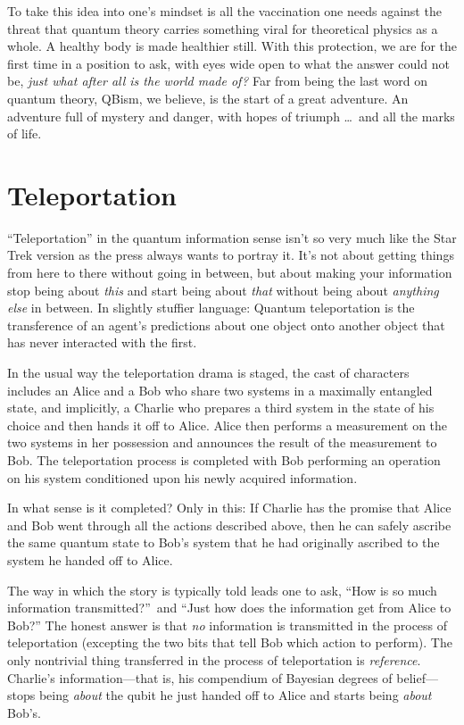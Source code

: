 \documentclass[aps,pra,superscriptaddress,12pt,tightenlines,nofootinbib]{revtex4-2}
\begin{document}
To take this idea into one's mindset is all the vaccination one needs against the threat that quantum theory carries something viral for theoretical physics as a whole.  A healthy body is made healthier still.  With this protection, we are for the first time in a position to ask, with eyes wide open to what the answer could not be, {\it just what after all is the world made of?}  Far from being the last word on quantum theory, QBism, we believe, is the start of a great adventure.  An adventure full of mystery and danger, with hopes of triumph \ldots\ and all the marks of life.


\section{Teleportation}

``Teleportation'' in the quantum information sense isn't so very much
like the Star Trek version as the press always wants to portray it.
It's not about getting things from here to there without going in
between, but about making your information stop being about {\it this\/} and
start being about {\it that\/} without being about {\it anything else\/} in between.
In slightly stuffier language: Quantum teleportation is the
transference of an agent's predictions about one object onto another
object that has never interacted with the first.

In the usual way the teleportation drama is staged, the cast of
characters includes an Alice and a Bob who share two systems in a
maximally entangled state, and implicitly, a Charlie who prepares a
third system in the state of his choice and then hands it off to
Alice.  Alice then performs a measurement on the two systems in her
possession and announces the result of the measurement to Bob.  The
teleportation process is completed with Bob performing an operation on
his system conditioned upon his newly acquired information.

In what sense is it completed?  Only in this:  If Charlie has the
promise that Alice and Bob went through all the actions described
above, then he can safely ascribe the same quantum state to Bob's
system that he had originally ascribed to the system he handed off to
Alice.

The way in which the story is typically told leads one to ask, ``How is so much information transmitted?''\  and ``Just how does the information get from Alice to Bob?'' The honest answer is that  {\it no\/} information is transmitted in the process of teleportation (excepting the two bits that tell Bob which action to perform).  The only nontrivial thing transferred in the process of teleportation is {\it reference}.  Charlie's information---that is, his compendium of Bayesian degrees of belief---stops being {\it about\/} the qubit he just handed off to Alice and starts being {\it about\/} Bob's.
\end{document}
